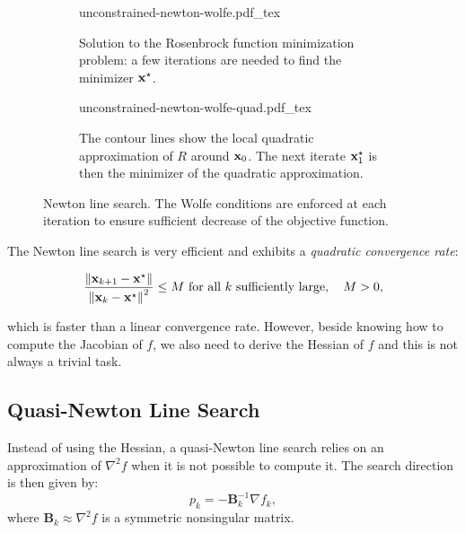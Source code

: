 \begin{figure}
  \setlength{\belowcaptionskip}{\baselineskip}
  \centering
  \begin{subfigure}{0.8\columnwidth}
    \centering
        {\def\svgwidth{\linewidth}
          {\footnotesize
            
                       {unconstrained-newton-wolfe.pdf_tex}
          }
        }
        \caption{Solution to the Rosenbrock
          function minimization problem: a few iterations are needed
          to find the minimizer $\mathbf{x}^{\star}$.}
        \label{fig:chap3-unconstrained-newton-wolfe-a}
  \end{subfigure}
  \begin{subfigure}{0.8\columnwidth}
    \centering
        {\def\svgwidth{\linewidth}
          {\footnotesize
            
                       {unconstrained-newton-wolfe-quad.pdf_tex}
          }
        }
        \caption{The contour lines show the local quadratic
          approximation of $R$ around $\mathbf{x}_0$. The next iterate
          $\mathbf{x}^{\star}_1$ is then the minimizer of the quadratic
          approximation.}
        \label{fig:chap3-unconstrained-newton-wolfe-quad}
  \end{subfigure}
  \caption[Newton line search.]{Newton line search. The Wolfe
    conditions are enforced at each iteration to ensure sufficient
    decrease of the objective function.}
  \label{fig:chap3-unconstrained-newton-wolfe}
\end{figure}

The Newton line search is very efficient and exhibits a
\emph{quadratic convergence rate}:

\begin{equation}
\frac{\left\lVert \mathbf{x}_{k+1}-\mathbf{x}^{\star} \right\rVert}{\left\lVert \mathbf{x}_k-\mathbf{x}^{\star} \right\rVert^2}
\le M \text{ for all } k \text{ sufficiently large}, \quad M>0,
\end{equation}

\noindent which is faster than a linear convergence rate. However, beside
knowing how to compute the Jacobian of $f$, we also need to derive the
Hessian of $f$ and this is not always a trivial task.

\subsection{Quasi-Newton Line Search}
\label{subsubsec:chap3-quasi-newton-line-search}

Instead of using the Hessian, a quasi-Newton line search relies on an
approximation of $\nabla^2 f$ when it is not possible to compute
it. The search direction is then given by:
\begin{equation}
p_k=-\mathbf{B}_k^{-1}\nabla f_k,
\end{equation}
\noindent where $\mathbf{B}_k\approx\nabla^2 f$ is a symmetric nonsingular
matrix.

